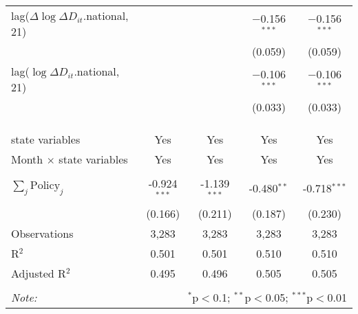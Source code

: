 \begin{tabular}{@{\extracolsep{1pt}}lcccc}
  lag($\Delta \log \Delta D_{it}$.national, 21) &  &  & $-$0.156$^{***}$ & $-$0.156$^{***}$ \\ 
  &  &  & (0.059) & (0.059) \\ 
  lag($\log \Delta D_{it}$.national, 21) &  &  & $-$0.106$^{***}$ & $-$0.106$^{***}$ \\ 
  &  &  & (0.033) & (0.033) \\ 
   &  &  &  &  \\ 
  &  &  &  &  \\ 
 \hline \\[-1.8ex] 
state variables & Yes & Yes & Yes & Yes \\ 
Month $\times$ state variables & Yes & Yes & Yes & Yes \\ 
\hline \\[-1.8ex] 
$\sum_j \mathrm{Policy}_j$ & -0.924$^{***}$ & -1.139$^{***}$ & -0.480$^{**}$ & -0.718$^{***}$ \\ 
 & (0.166) & (0.211) & (0.187) & (0.230) \\ 
Observations & 3,283 & 3,283 & 3,283 & 3,283 \\ 
R$^{2}$ & 0.501 & 0.501 & 0.510 & 0.510 \\ 
Adjusted R$^{2}$ & 0.495 & 0.496 & 0.505 & 0.505 \\ 
\hline 
\hline \\[-1.8ex] 
\textit{Note:}  & \multicolumn{4}{r}{$^{*}$p$<$0.1; $^{**}$p$<$0.05; $^{***}$p$<$0.01} \\ 
\end{tabular} 